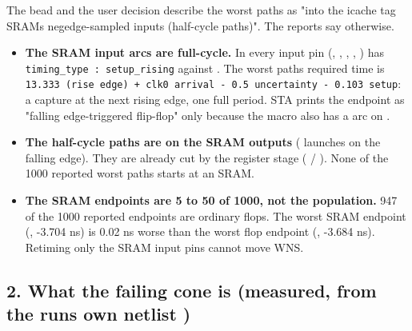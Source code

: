 \begin{record}

The bead and the user decision describe the worst paths as "into the
icache tag SRAM\textquotesingle s negedge-sampled inputs (half-cycle
paths)". The reports say otherwise.

\begin{itemize}
\tightlist
\item
  \textbf{The SRAM input arcs are full-cycle.} In
  every input pin (, , , ,
  ) has
  \texttt{timing\_\allowbreak{}type\ :\allowbreak{}\ setup\_\allowbreak{}rising}
  against . The worst path\textquotesingle s required time is
  \texttt{13.\allowbreak{}333\ (rise\ edge)\ +\allowbreak{}\ clk0\ arrival\ -\allowbreak{}\ 0.\allowbreak{}5\ uncertainty\ -\allowbreak{}\ 0.\allowbreak{}103\ setup}:
  a capture at the next rising edge, one full period. STA prints the
  endpoint as "falling edge-triggered flip-flop" only because the macro
  also has a  arc on .
\item
  \textbf{The half-cycle paths are on the SRAM outputs} (
  launches on the falling edge). They are already cut by the
   register stage ( /
  ). None of the 1000 reported worst paths starts at
  an SRAM.
\item
  \textbf{The SRAM endpoints are 5 to 50 of 1000, not the population.}
  947 of the 1000 reported endpoints are ordinary flops. The worst SRAM
  endpoint (, -3.704 ns) is 0.02 ns worse than the
  worst flop endpoint (, -3.684 ns). Retiming only
  the SRAM input pins cannot move WNS.
\end{itemize}

\end{record}

\subsection{\texorpdfstring{2. What the failing cone is (measured, from
the run\textquotesingle s own netlist
)}{2. What the failing cone is (measured, from the run\textquotesingle s own netlist )}}\label{cr:defect:sky130-cpu-ss-setup-r51p:2-what-the-failing-cone-is-measured-from-the-runs-own-netlist-54-openroad-fillinsertionrv32i-cpu-topnlv}

